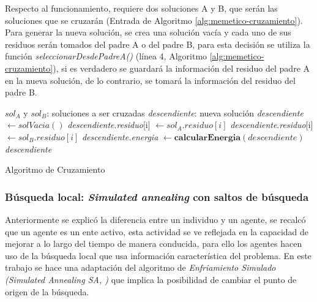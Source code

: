 Respecto al funcionamiento, requiere dos soluciones A y B, que serán las soluciones que se cruzarán (Entrada de Algoritmo \ref{alg:memetico-cruzamiento}). Para generar la nueva solución, se crea una solución vacía y cada uno de sus residuos serán tomados del padre A o del padre B, para esta decisión se utiliza la función \textit{seleccionarDesdePadreA()} (línea 4, Algoritmo \ref{alg:memetico-cruzamiento}), si es verdadero se guardará la información del residuo del padre A en la nueva solución, de lo contrario, se tomará la información del residuo del padre B.
\\[25pt]
\begin{algorithm}[H]
	\begin{algorithmic}[1]
		\REQUIRE $sol_{A}$ y $sol_{B}$: soluciones a ser cruzadas
		\ENSURE \textit{descendiente}: nueva solución
		\STATE \textit{descendiente} $\leftarrow solVacia()$
    				\STATE \textit{descendiente}.\textit{residuo}[i] $\gets sol_{A}.residuo[i]$
    			\ELSE
    				\STATE \textit{descendiente}.\textit{residuo}[i] $\gets sol_{B}.residuo[i]$
    			\ENDIF
			\ENDIF
		\ENDFOR
		\STATE \textit{descendiente.energia} $\gets \textbf{calcularEnergia}(descendiente)$
		\RETURN \textit{descendiente}
	\end{algorithmic}
	\caption{Algoritmo de Cruzamiento}
	\label{alg:memetico-cruzamiento}
\end{algorithm}

\subsubsection{Búsqueda local: \textit{Simulated annealing} con saltos de búsqueda}

Anteriormente se explicó la diferencia entre un individuo y un agente, se recalcó que un agente es un ente activo, esta actividad se ve reflejada en la capacidad de mejorar a lo largo del tiempo de manera conducida, para ello los agentes hacen uso de la búsqueda local que usa información característica del problema. En este trabajo se hace una adaptación del algoritmo de \textit{Enfriamiento Simulado (Simulated Annealing SA, \citealp{Kirkpatrick1983})} que implica la posibilidad de cambiar el punto de origen de la búsqueda.

